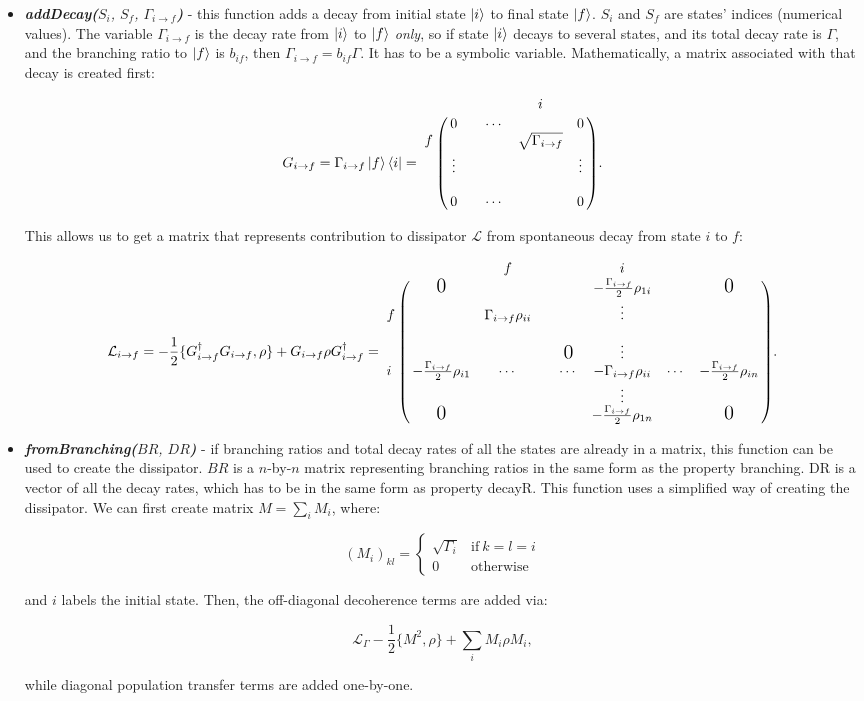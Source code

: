 \documentclass{article}
\numberwithin{equation}{section}
\numberwithin{figure}{section}
\numberwithin{table}{section}
\newcommand\codefun[2]{\textit{\textbf{#1(}#2\textbf{)}}}
\newcommand\codevar[1]{\ttfamily #1\rmfamily}
\begin{document}
\begin{itemize}
\item \codefun{addDecay}{$S_i$, $S_f$, $\Gamma_{i\rightarrow f}$} - this function adds a decay from initial state $\ket{i}$ to final state $\ket{f}$. $S_i$ and $S_f$ are states' indices (numerical values). The variable $\Gamma_{i\rightarrow f}$ is the decay rate from $\ket{i}$ to $\ket{f}$ \emph{only}, so if state $\ket{i}$ decays to several states, and its total decay rate is $\Gamma$, and the branching ratio to $\ket{f}$ is $b_{if}$, then $\Gamma_{i\rightarrow f}=b_{if}\Gamma$. It has to be a symbolic variable. Mathematically, a matrix associated with that decay is created first:

\[G_{i\rightarrow f}=\Gamma_{i \rightarrow f}\ket{f}\bra{i}=\bordermatrix{&&&&i&\cr
&0&&\cdots&&0\cr
f&&&&\sqrt{\Gamma_{i\rightarrow f}}&\cr
&\vdots&&&&\vdots\cr
&&&&&\cr
&0&&\cdots&&0
}.\]

\noindent This allows us to get a matrix that represents contribution to dissipator $\mathcal{L}$ from spontaneous decay from state $i$ to $f$:

\[
\mathcal{L}_{i\rightarrow f}=-\frac{1}{2}\{G^{\dag}_{i\rightarrow f}G_{i\rightarrow f},\rho\}+G_{i\rightarrow f}\rho G^{\dag}_{i\rightarrow f}=
\bordermatrix{&&f&&&i&&\cr
&\mbox{\Large 0}&&&&-\frac{\Gamma_{i\rightarrow f}}{2}\rho_{1i}&&\mbox{\Large 0}\cr
f&&\Gamma_{i\rightarrow f}\rho_{ii}&&&\vdots&&\cr
&&&&&&&\cr
&&&&\mbox{\Large 0}&\vdots&&\cr
i&-\frac{\Gamma_{i\rightarrow f}}{2}\rho_{i1}&\cdots&&\cdots&-\Gamma_{i\rightarrow f}\rho_{ii}&\cdots&-\frac{\Gamma_{i\rightarrow f}}{2}\rho_{in}\cr
&&&&&\vdots&&\cr
&\mbox{\Large 0}&&&&-\frac{\Gamma_{i\rightarrow f}}{2}\rho_{1n}&&\mbox{\Large 0}}.
\]

\item \codefun{fromBranching}{$BR$, $DR$} - if branching ratios and total decay rates of all the states are already in a matrix, this function can be used to create the dissipator. $BR$ is a $n$-by-$n$ matrix representing branching ratios in the same form as the property \codevar{branching}. DR is a vector of all the decay rates, which has to be in the same form as property \codevar{decayR}. This function uses a simplified way of creating the dissipator. We can first create matrix $M=\sum_i{M_i}$, where: 

\begin{displaymath}
(M_i)_{kl}=\begin{cases}
\sqrt{\Gamma_i}&\mathrm{if}\ k=l=i\\
0&\mathrm{otherwise}
\end{cases}
\end{displaymath}

\noindent and $i$ labels the initial state. Then, the off-diagonal decoherence terms are added via: 

\begin{displaymath}
\mathcal{L}_{\Gamma}-\frac{1}{2}\{M^2,\rho\}+\sum_i{M_i\rho M_i},
\end{displaymath}

\noindent while diagonal population transfer terms are added one-by-one.

\end{itemize}
\end{document}
